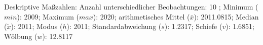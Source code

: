 				\label{tableValues:bstu16_g1}
				\vspace*{-\baselineskip}
                    \begin{noten}
                	    \note{} Deskriptive Maßzahlen:
                	    Anzahl unterschiedlicher Beobachtungen: 10%
                	    ; 
                	      Minimum ($min$): 2009; 
                	      Maximum ($max$): 2020; 
                	      arithmetisches Mittel ($\bar{x}$): \num[round-mode=places,round-precision=2]{2011.0815}; 
                	      Median ($\tilde{x}$): 2011; 
                	      Modus ($h$): 2011; 
                	      Standardabweichung ($s$): \num[round-mode=places,round-precision=2]{1.2317}; 
                	      Schiefe ($v$): \num[round-mode=places,round-precision=2]{1.6851}; 
                	      Wölbung ($w$): \num[round-mode=places,round-precision=2]{12.8117}
                     \end{noten}


